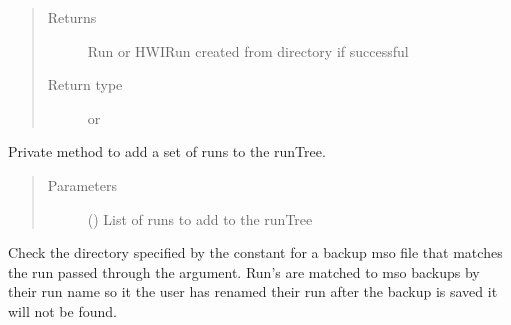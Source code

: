 \documentclass[letterpaper,10pt,english]{sphinxmanual}
\begin{document}
\begin{fulllineitems}
\begin{fulllineitems}
\begin{quote}
\begin{description}
\item[{Returns}] \leavevmode
Run or HWIRun created from directory if successful

\item[{Return type}] \leavevmode
{\hyperref[\detokenize{polo.crystallography:polo.crystallography.run.Run}]{}} or {\hyperref[\detokenize{polo.crystallography:polo.crystallography.run.HWIRun}]{}}

\end{description}\end{quote}

\end{fulllineitems}


\begin{fulllineitems}
\label{\detokenize{polo.widgets:polo.widgets.run_organizer.RunOrganizer._add_runs_to_tree}}
Private method to add a set of runs to the runTree.
\begin{quote}\begin{description}
\item[{Parameters}] \leavevmode
{} () \textendash{} List of runs to add to the runTree

\end{description}\end{quote}

\end{fulllineitems}


\begin{fulllineitems}
\label{\detokenize{polo.widgets:polo.widgets.run_organizer.RunOrganizer._check_for_existing_backup}}
Check the directory specified by the  constant for
a backup mso file that matches the run passed through the 
argument. Run’s are matched to mso backups by their run name so it
the user has renamed their run after the backup is saved it will not
be found.


\end{fulllineitems}
\end{fulllineitems}
\end{document}
